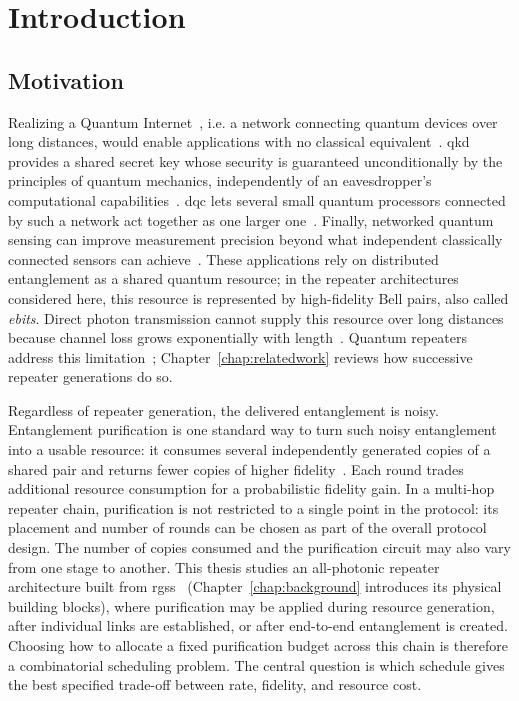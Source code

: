 \chapter{Introduction}
\label{chap:intro}

\section{Motivation}
\label{sec:intro:motivation}

Realizing a Quantum Internet~\cite{VanMeter2014Quantum,Kozlowski2023Architectural}, i.e. a network connecting quantum devices over long distances, would enable applications with no classical equivalent~\cite{Azuma2023Quantum,Hajdusek2023Quantum}. \Gls{qkd} provides a shared secret key whose security is guaranteed unconditionally by the principles of quantum mechanics, independently of an eavesdropper's computational capabilities~\cite{Bennett1992Quantum,Bennett2014Quantum,Scarani2009Security}. \Gls{dqc} lets several small quantum processors connected by such a network act together as one larger one~\cite{Cirac1999Distributed,Boschero2025Distributed}. Finally, networked quantum sensing can improve measurement precision beyond what independent classically connected sensors can achieve~\cite{Azuma2023Quantum,Proctor2017Networked,Proctor2018Multiparameter}. These applications rely on distributed entanglement as a shared quantum resource; in the repeater architectures considered here, this resource is represented by high-fidelity Bell pairs, also called \emph{ebits}. Direct photon transmission cannot supply this resource over long distances because channel loss grows exponentially with length~\cite{Azuma2023Quantum}. Quantum repeaters address this limitation~\cite{Briegel1998Quantum}; Chapter~\ref{chap:relatedwork} reviews how successive repeater generations do so.

Regardless of repeater generation, the delivered entanglement is noisy. Entanglement purification is one standard way to turn such noisy entanglement into a usable resource: it consumes several independently generated copies of a shared pair and returns fewer copies of higher fidelity~\cite{Bennett1996Purification,Deutsch1996Quantum}. Each round trades additional resource consumption for a probabilistic fidelity gain. In a multi-hop repeater chain, purification is not restricted to a single point in the protocol: its placement and number of rounds can be chosen as part of the overall protocol design. The number of copies consumed and the purification circuit may also vary from one stage to another. This thesis studies an all-photonic repeater architecture built from \Glspl{rgs}~\cite{Azuma2015All} (Chapter~\ref{chap:background} introduces its physical building blocks), where purification may be applied during resource generation, after individual links are established, or after end-to-end entanglement is created. Choosing how to allocate a fixed purification budget across this chain is therefore a combinatorial scheduling problem. The central question is which schedule gives the best specified trade-off between rate, fidelity, and resource cost.

